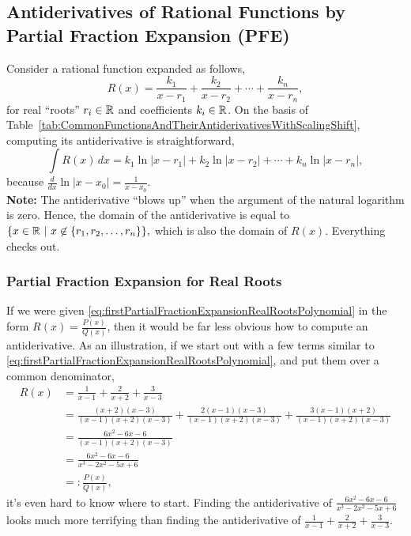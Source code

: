 \subsection{Antiderivatives of Rational Functions by Partial Fraction Expansion (PFE)}
\label{sec:PFEforAntiderivtivesRationalFunctions}

Consider a rational function expanded as follows, 
\begin{equation}
\label{eq:firstPartialFractionExpansionRealRootsPolynomial}
    R(x) = \frac{k_1}{x - r_1} + \frac{k_2}{x - r_2} + \cdots + \frac{k_n}{x - r_n},
\end{equation}
for real ``roots''  $r_i \in \mathbb R$ and coefficients $k_i \in \mathbb R$. On the basis of Table~\ref{tab:CommonFunctionsAndTheirAntiderivativesWithScalingShift}, computing its antiderivative is straightforward,
$$ \int R(x) \, dx = k_1 \ln|x-r_1| + k_2\ln|x-r_2| + \cdots + k_n \ln|x-r_n|,$$
because $\frac{d}{dx} \ln|x - x_0| = \frac{1}{x-x_0}$. \\

\textbf{Note:} The antiderivative ``blows up'' when the argument of the natural logarithm is zero. Hence, the domain of the antiderivative is equal to $\{ x \in \mathbb R~|~ x \not \in \{r_1, r_2, \ldots, r_n\} \},$ which is also the domain of $R(x)$. Everything checks out. \\

\subsubsection{Partial Fraction Expansion for Real Roots}

If we were given \eqref{eq:firstPartialFractionExpansionRealRootsPolynomial} in the form $R(x) = \frac{P(x)}{Q(x)}$, then it would be far less obvious how to compute an antiderivative. As an illustration, if we start out with a few terms similar to \eqref{eq:firstPartialFractionExpansionRealRootsPolynomial}, and put them over a common denominator,
\begin{equation}
\label{eq:firstPartialFractionExpansionRealRootsPolynomial02}
\begin{aligned}
     R(x) &= \frac{1}{x - 1} + \frac{2}{x + 2} + \frac{3}{x - 3} \\[1em]
     & = \frac{(x+2)(x-3)}{(x-1)(x + 2)(x-3)} + \frac{2(x-1)(x-3)}{(x-1)(x + 2)(x-3)} + \frac{3(x-1)(x+2)}{(x-1)(x + 2)(x-3)} \\[1em]
     & = \frac{6x^2 - 6x - 6}{(x - 1)(x + 2)(x - 3)} \\[1em]
     &= \frac{6x^2 - 6x - 6}{x^3 - 2x^2 - 5x + 6} \\[1em]
     &=: \frac{P(x)}{Q(x)},
\end{aligned}
\end{equation}
it's even hard to know where to start. Finding the antiderivative of $\frac{6x^2 - 6x - 6}{x^3 - 2x^2 - 5x + 6}$ looks much more terrifying than finding the antiderivative of $\frac{1}{x - 1} + \frac{2}{x + 2} + \frac{3}{x - 3}$. \\


